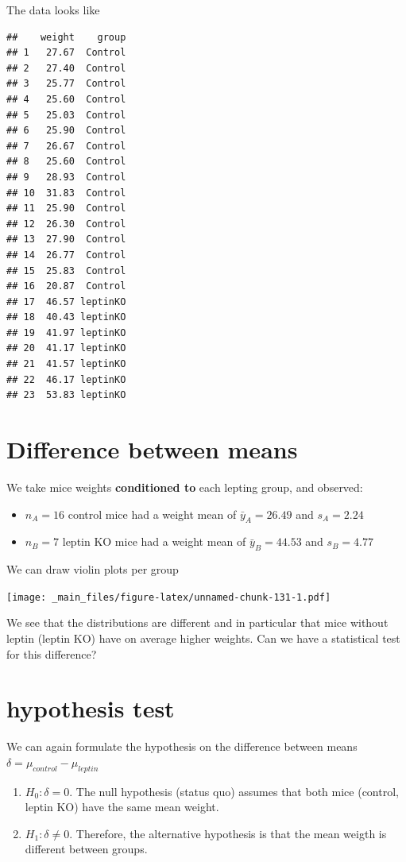\documentclass[
]{book}
\begin{document}
The data looks like

\begin{verbatim}
##    weight    group
## 1   27.67  Control
## 2   27.40  Control
## 3   25.77  Control
## 4   25.60  Control
## 5   25.03  Control
## 6   25.90  Control
## 7   26.67  Control
## 8   25.60  Control
## 9   28.93  Control
## 10  31.83  Control
## 11  25.90  Control
## 12  26.30  Control
## 13  27.90  Control
## 14  26.77  Control
## 15  25.83  Control
## 16  20.87  Control
## 17  46.57 leptinKO
## 18  40.43 leptinKO
## 19  41.97 leptinKO
## 20  41.17 leptinKO
## 21  41.57 leptinKO
## 22  46.17 leptinKO
## 23  53.83 leptinKO
\end{verbatim}

\hypertarget{difference-between-means-1}{%
\section{Difference between means}\label{difference-between-means-1}}

We take mice weights \textbf{conditioned to} each lepting group, and observed:

\begin{itemize}
\item
  \(n_A=16\) control mice had a weight mean of \(\bar{y}_A=26.49\) and \(s_A=2.24\)
\item
  \(n_B=7\) leptin KO mice had a weight mean of \(\bar{y}_B=44.53\) and \(s_B=4.77\)
\end{itemize}

We can draw violin plots per group

\texttt{[image: \_main\_files/figure-latex/unnamed-chunk-131-1.pdf]}

We see that the distributions are different and in particular that mice without leptin (leptin KO) have on average higher weights. Can we have a statistical test for this difference?

\hypertarget{hypothesis-test-1}{%
\section{hypothesis test}\label{hypothesis-test-1}}

We can again formulate the hypothesis on the difference between means \(\delta=\mu_{control} -\mu_{leptin}\)

\begin{enumerate}
\def\labelenumi{\alph{enumi}.}
\item
  \(H_0: \delta=0\). The null hypothesis (status quo) assumes that both mice (control, leptin KO) have the same mean weight.
\item
  \(H_1: \delta \neq 0\). Therefore, the alternative hypothesis is that the mean weigth is different between groups.
\end{enumerate}
\end{document}
